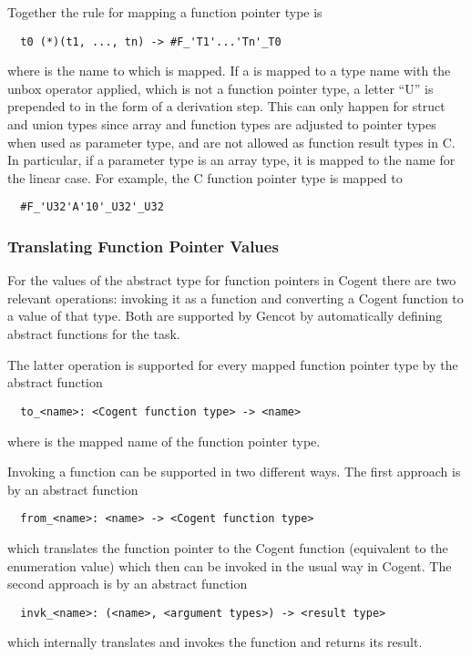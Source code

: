 Together the rule for mapping a function pointer type is
\begin{verbatim}
  t0 (*)(t1, ..., tn) -> #F_'T1'...'Tn'_T0
\end{verbatim}
where  is the name to which  is mapped.
If a  is mapped to a type name with the unbox operator applied, which is not a function pointer type,
a letter ``U'' is prepended to  in the form of a derivation step. This can only happen for struct and union types
since array and function types are adjusted to pointer types when used as parameter type, and are not allowed as 
function result types in C. In particular, if a parameter type  is an array type, it is mapped to
the name for the linear case. For example, the C function pointer type  is mapped to
\begin{verbatim}
  #F_'U32'A'10'_U32'_U32
\end{verbatim}

\subsubsection{Translating Function Pointer Values}

For the values of the abstract type for function pointers in Cogent there are two relevant operations: invoking
it as a function and converting a Cogent function to a value of that type. Both are supported by Gencot
by automatically defining abstract functions for the task.

The latter operation is supported for every mapped function pointer type by the abstract function
\begin{verbatim}
  to_<name>: <Cogent function type> -> <name>
\end{verbatim}
where  is the mapped name of the function pointer type.

Invoking a function can be supported in two different ways. The first approach is by an abstract function
\begin{verbatim}
  from_<name>: <name> -> <Cogent function type>
\end{verbatim}
which translates the function pointer to the Cogent function (equivalent to the enumeration value) which
then can be invoked in the usual way in Cogent. The second approach is by an abstract function 
\begin{verbatim}
  invk_<name>: (<name>, <argument types>) -> <result type>
\end{verbatim}
which internally translates and invokes the function and returns its result.

